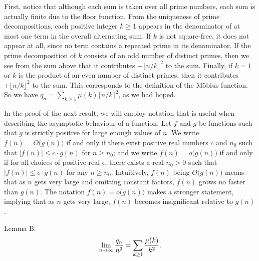 First, notice that although each sum is taken over all prime numbers, each sum is actually finite due to the floor function. From the uniqueness of prime decompositions, each positive integer $k\geq 1$ appears in the denominator of at most one term in the overall alternating sum. If $k$ is not square-free, it does not appear at all, since no term contains a repeated prime in its denominator. If the prime decomposition of $k$ consists of an odd number of distinct primes, then we see from the sum above that it contributes $-\lfloor n/k\rfloor^2$ to the sum. Finally, if $k = 1$ or $k$ is the product of an even number of distinct primes, then it contributes $+\lfloor n/k\rfloor^2$ to the sum. This corresponds to the definition of the M\"obius function. So we have $q_n = \sum_{k\geq 1} \mu(k) \lfloor n/k\rfloor ^2$, as we had hoped.\slug

In the proof of the next result, we will employ notation that is useful when describing the asymptotic behaviour of a function. Let $f$ and $g$ be functions such that $g$ is strictly positive for large enough values of $n$. We write $f(n) = O\bigl(g(n)\bigr)$ if and only if there exist positive real numbers $c$ and $n_0$ such that $|f(n)| \leq c\cdot g(n)$ for $n\geq n_0$; and we write $f(n) = o\bigl(g(n)\bigr)$ if and only if for all choices of positive real $\epsilon$, there exists a real $n_0>0$ such that $|f(n)| \leq \epsilon\cdot g(n)$ for any $n\geq n_0$. Intuitively, $f(n)$ being $O\bigl(g(n)\bigr)$ means that as $n$ gets very large and omitting constant factors, $f(n)$ grows no faster than $g(n)$. The notation $f(n) = o\bigl(g(n)\bigr)$ makes a stronger statement, implying that as $n$ gets very large, $f(n)$ becomes insignificant relative to $g(n)$.

\proclaim Lemma B.
$$\lim_{n\rightarrow\infty} {q_n\over n^2} = \sum_{k\geq 1} {\mu(k)\over k^2}.$$

